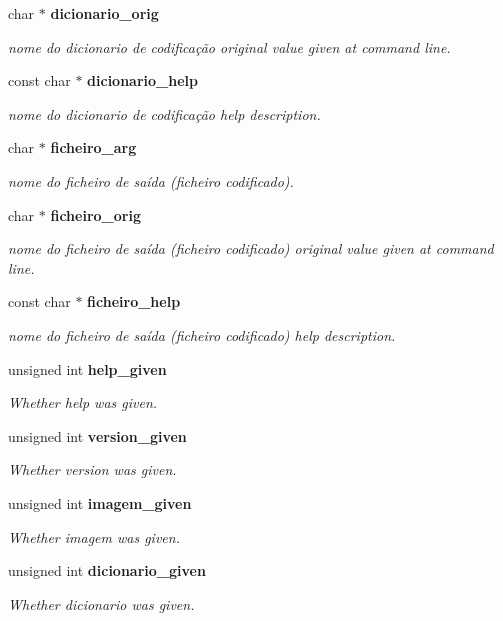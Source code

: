 \begin{DoxyCompactItemize}
char $\ast$ {\bf dicionario\_\-orig}
\begin{DoxyCompactList}\small\item\em nome do dicionario de codificação original value given at command line. \end{DoxyCompactList}\item 
const char $\ast$ {\bf dicionario\_\-help}
\begin{DoxyCompactList}\small\item\em nome do dicionario de codificação help description. \end{DoxyCompactList}\item 
char $\ast$ {\bf ficheiro\_\-arg}
\begin{DoxyCompactList}\small\item\em nome do ficheiro de saída (ficheiro codificado). \end{DoxyCompactList}\item 
char $\ast$ {\bf ficheiro\_\-orig}
\begin{DoxyCompactList}\small\item\em nome do ficheiro de saída (ficheiro codificado) original value given at command line. \end{DoxyCompactList}\item 
const char $\ast$ {\bf ficheiro\_\-help}
\begin{DoxyCompactList}\small\item\em nome do ficheiro de saída (ficheiro codificado) help description. \end{DoxyCompactList}\item 
unsigned int {\bf help\_\-given}
\begin{DoxyCompactList}\small\item\em Whether help was given. \end{DoxyCompactList}\item 
unsigned int {\bf version\_\-given}
\begin{DoxyCompactList}\small\item\em Whether version was given. \end{DoxyCompactList}\item 
unsigned int {\bf imagem\_\-given}
\begin{DoxyCompactList}\small\item\em Whether imagem was given. \end{DoxyCompactList}\item 
unsigned int {\bf dicionario\_\-given}
\begin{DoxyCompactList}\small\item\em Whether dicionario was given. \end{DoxyCompactList}\item 

\end{DoxyCompactItemize}
